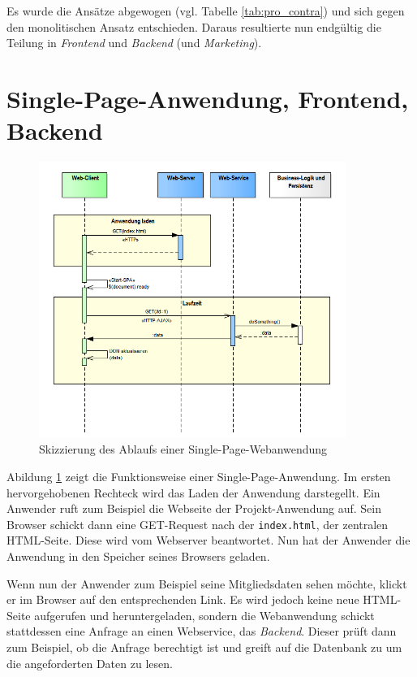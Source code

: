 \documentclass[a4paper, 11pt]{article}
\begin{document}
Es wurde die Ansätze abgewogen (vgl. Tabelle \ref{tab:pro_contra}) und sich
gegen den monolitischen Ansatz entschieden. Daraus resultierte nun endgültig
die Teilung in \emph{Frontend} und \emph{Backend} (und \emph{Marketing}).

\section{Single-Page-Anwendung, Frontend, Backend}

\begin{figure}[htpb]
    \centering
    \includegraphics[width=10cm]{images/SPA_Start.png}
    \caption{Skizzierung des Ablaufs einer Single-Page-Webanwendung}
    \label{fig:spa_start}
\end{figure}

Abildung \ref{fig:spa_start} zeigt die Funktionsweise einer
Single-Page-Anwendung. Im ersten hervorgehobenen Rechteck wird das Laden der
Anwendung darstegellt. Ein Anwender ruft zum Beispiel die Webseite der
Projekt-Anwendung auf. Sein Browser schickt dann eine GET-Request nach der
\texttt{index.html}, der zentralen HTML-Seite. Diese wird vom Webserver
beantwortet. Nun hat der Anwender die Anwendung in den Speicher seines Browsers
geladen. 

Wenn nun der Anwender zum Beispiel seine Mitgliedsdaten sehen möchte, klickt er
im Browser auf den entsprechenden Link. Es wird jedoch keine neue HTML-Seite
aufgerufen und heruntergeladen, sondern die Webanwendung schickt stattdessen
eine Anfrage an einen Webservice, das \emph{Backend}. Dieser prüft dann zum
Beispiel, ob die Anfrage berechtigt ist und greift auf die Datenbank zu um die
angeforderten Daten zu lesen.
\end{document}
